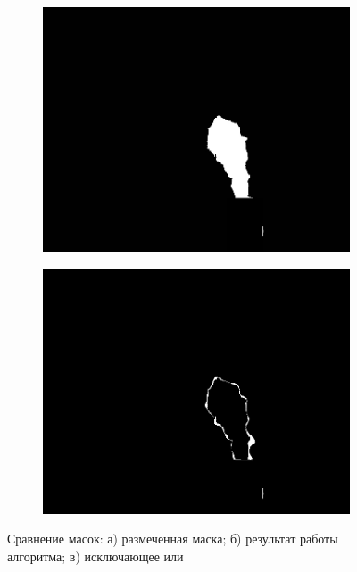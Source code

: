 \documentclass[14pt, a4paper]{extreport}
\begin{document}
\begin{figure}[h!]
\begin{subfigure}{.32\textwidth}
			\includegraphics[width = \textwidth]{image/chapter_3/examples/mask/240}
			\caption{}
		\end{subfigure}
		\hspace{0.1cm}
		\begin{subfigure}{.32\textwidth}
			\centering
			\includegraphics[width = \textwidth]{image/chapter_3/examples/mask_dif/240}
			\caption{}
		\end{subfigure}
		\caption{Сравнение масок: а) размеченная маска; б) результат работы алгоритма; в) исключающее или}
		\label{fig:mask_dif}
	\end{figure}
	
\end{document}
